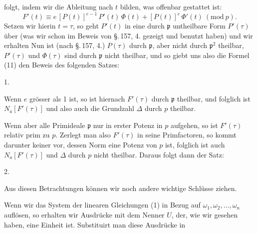 
folgt, indem wir die Ableitung nach $t$ bilden, was offenbar gestattet ist:
\[
F'(t) \equiv e\,[P(t)]^{e-1}\,P'(t)\,\Phi(t) + [P(t)]^e\,\Phi'(t)\ (\mathrm{mod}\ p).
\]
Setzen wir hierin $t=\tau$, so geht $P'(t)$ in eine durch $\mathfrak{p}$ untheilbare Form $P'(\tau)$ über (was wir schon im Beweis von \S.\,157, 4. gezeigt und benutzt haben) und wir erhalten
Nun ist (nach \S.\,157, 4.) $P(\tau)$ durch $\mathfrak{p}$, aber nicht durch $\mathfrak{p}^2$ theilbar, $P'(\tau)$ und $\Phi(\tau)$ sind durch $\mathfrak{p}$ nicht theilbar, und so giebt uns also die Formel (11) den Beweis des folgenden Satzes:

1. 

Wenn $e$ grösser als 1 ist, so ist hiernach $F'(\tau)$ durch $\mathfrak{p}$ theilbar, und folglich ist $N_a[F'(\tau)]$ und also auch die Grundzahl $\Delta$ durch $p$ theilbar.

Wenn aber alle Primideale $\mathfrak{p}$ nur in erster Potenz in $p$ aufgehen, so ist $F'(\tau)$ relativ prim zu $p$. Zerlegt man also $F'(\tau)$ in seine Primfactoren, so kommt darunter keiner vor, dessen Norm eine Potenz von $p$ ist, folglich ist auch $N_a[F'(\tau)]$ und $\Delta$ durch $p$ nicht theilbar. Daraus folgt dann der Satz:

2. 

Aus diesen Betrachtungen können wir noch andere wichtige Schlüsse ziehen.

Wenn wir das System der linearen Gleichungen (1) in Bezug auf $\omega_1, \omega_2, \ldots, \omega_n$ auflösen, so erhalten wir Ausdrücke mit dem Nenner $U$, der, wie wir gesehen haben, eine Einheit ist. Substituirt man diese Ausdrücke in
